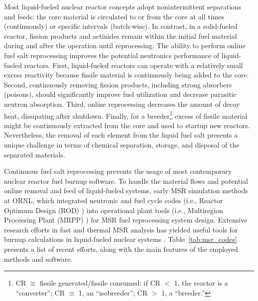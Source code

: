 Most liquid-fueled nuclear reactor concepts adopt nonintermittent separations 
and feeds: the core material is circulated to or from the core at all times 
(continuously) or specific intervals (batch-wise). In contrast, in a 
solid-fueled reactor, fission products and actinides remain within the initial 
fuel material during and after the operation until reprocessing. The ability 
to perform online fuel salt reprocessing improves the potential neutronics 
performance of liquid-fueled reactors. First, liquid-fueled reactors can 
operate with a relatively small excess reactivity because fissile material is 
continuously being added to the core. Second, continuously removing fission 
products, including strong absorbers (poisons), should significantly improve 
fuel utilization and decrease parasitic neutron absorption. Third, online 
reprocessing decreases the amount of decay heat, dissipating after shutdown.
Finally, for a breeder\footnote{\gls{CR} 
	$\equiv$ fissile generated/fissile consumed: if CR $<$ 1, the reactor is a 
	``converter''; CR $\equiv$ 1, an ``isobreeder''; CR $>$ 1, a 
	``breeder.''} excess of fissile material might be continuously extracted  
from the core and used to startup new reactors. Nevertheless, the removal of 
each element from the liquid fuel salt presents a unique challenge in terms of 
chemical separation, storage, and disposal of the separated materials.

Continuous fuel salt reprocessing prevents the usage of most contemporary 
nuclear reactor fuel burnup software. To handle the material flows and 
potential online removal and feed of liquid-fueled systems, early \gls{MSR} 
simulation methods at \gls{ORNL}, which integrated neutronic and fuel cycle 
codes (i.e., Reactor Optimum Design (ROD) \cite{bauman_rod_1971}) into 
operational plant tools (i.e., Multiregion Processing Plant (MRPP) 
\cite{kee_mrpp_1976}) for \gls{MSR} fuel reprocessing system design. Extensive 
research efforts in fast and thermal MSR analysis has yielded useful tools 
for burnup calculations in liquid-fueled nuclear systems  
\cite{fiorina_investigation_2013, sheu_depletion_2013, aufiero_extended_2013,
heuer_towards_2014, park_whole_2015, betzler_molten_2017, 
betzler_molten_2019}. Table~\ref{tab:msr_codes} presents a list of recent 
efforts, along with the main features of the employed methods and software.
\FloatBarrier

